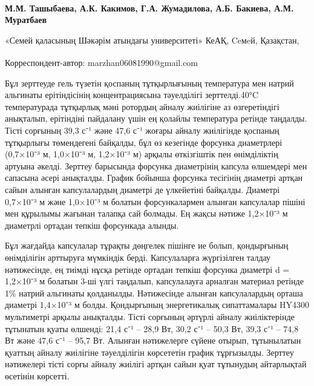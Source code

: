 
\begin{articleheader}

{\bfseries
М.М. Ташыбаева\textsuperscript{\envelope },
А.К. Какимов,
Г.А. Жумадилова,
А.Б. Бакиева,
А.М. Муратбаев
}
\end{articleheader}

\begin{affiliation}
«Семей қаласының Шәкәрім атындағы университеті» КеАҚ, Ceмeй, Қазақстан,

\raggedright \textsuperscript{\envelope }Корреспондент-автор: marzhan06081990@gmail.com
\end{affiliation}

Бұл зерттеуде гель түзетін қоспаның тұтқырлығының температура мен натрий
альгинаты ерітіндісінің концентрациясына тәуелділігі зерттелді.40°C
температурада тұтқырлық мәні ротордың айналу жиілігіне аз өзгеретіндігі
анықталып, ерітіндіні пайдалану үшін ең қолайлы температура ретінде
таңдалды. Тісті сорғының 39,3 с⁻¹ және 47,6 с⁻¹ жоғары айналу жиілігінде
қоспаның тұтқырлығы төмендегені байқалды, бұл өз кезегінде форсунка
диаметрлері (0,7×10⁻³ м, 1,0×10⁻³ м, 1,2×10⁻³ м) арқылы өткізгіштік пен
өнімділіктің артуына әкелді. Зерттеу барысында форсунка диаметрінің
капсула өлшемдері мен сапасына әсері анықталды. График бойынша форсунка
тесігінің диаметрі артқан сайын алынған капсулалардың диаметрі де
үлкейетіні байқалды. Диаметрі 0,7×10⁻³ м және 1,0×10⁻³ м болатын
форсункалармен алынған капсулалар пішіні мен құрылымы жағынан талапқа
сай болмады. Ең жақсы нәтиже 1,2×10⁻³ м диаметрлі ортадан тепкіш
форсункада алынды.

Бұл жағдайда капсулалар тұрақты дөңгелек пішінге ие болып, қондырғының
өнімділігін арттыруға мүмкіндік берді. Капсулаларға жүргізілген талдау
нәтижесінде, ең тиімді нұсқа ретінде ортадан тепкіш форсунка диаметрі d
= 1,2×10⁻³ м болатын 3-ші үлгі таңдалып, капсулалауға арналған материал
ретінде 1\% натрий альгинаты қолданылды. Нәтижесінде алынған
капсулалардың орташа диаметрі 1,4×10⁻³ м болды. Қондырғының
энергетикалық сипаттамалары HY4300 мультиметрі арқылы анықталды. Тісті
сорғының әртүрлі айналу жиіліктерінде тұтынатын қуаты өлшенді: 21,4 с⁻¹
-- 28,9 Вт, 30,2 с⁻¹ -- 50,3 Вт, 39,3 с⁻¹ -- 74,8 Вт және 47,6 с⁻¹ --
95,7 Вт. Алынған нәтижелерге сүйене отырып, тұтынылатын қуаттың айналу
жиілігіне тәуелділігін көрсететін график тұрғызылды. Зерттеу нәтижелері
тісті сорғы айналу жиілігі артқан сайын қуат тұтынудың айтарлықтай
өсетінін көрсетті.

